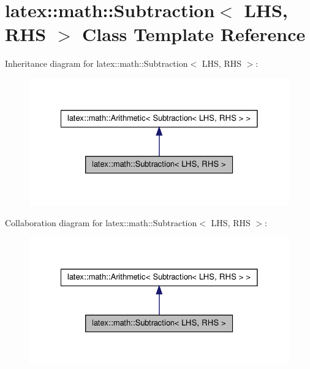 \hypertarget{classlatex_1_1math_1_1Subtraction}{\section{latex\-:\-:math\-:\-:\-Subtraction$<$ \-L\-H\-S, \-R\-H\-S $>$ \-Class \-Template \-Reference}
\label{classlatex_1_1math_1_1Subtraction}
}


\-Inheritance diagram for latex\-:\-:math\-:\-:\-Subtraction$<$ \-L\-H\-S, \-R\-H\-S $>$\-:
\nopagebreak
\begin{figure}[H]
\begin{center}
\leavevmode
\includegraphics[width=328pt]{classlatex_1_1math_1_1Subtraction__inherit__graph}
\end{center}
\end{figure}


\-Collaboration diagram for latex\-:\-:math\-:\-:\-Subtraction$<$ \-L\-H\-S, \-R\-H\-S $>$\-:
\nopagebreak
\begin{figure}[H]
\begin{center}
\leavevmode
\includegraphics[width=328pt]{classlatex_1_1math_1_1Subtraction__coll__graph}
\end{center}
\end{figure}

